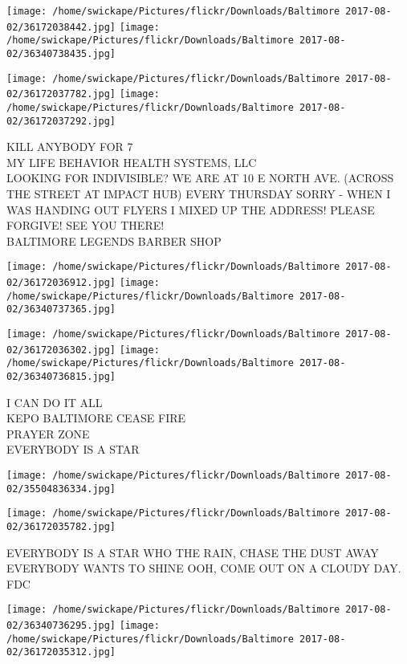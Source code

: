 \documentclass[10pt,letterpaper]{article}
\begin{document}
\texttt{[image: /home/swickape/Pictures/flickr/Downloads/Baltimore 2017-08-02/36172038442.jpg]}
\texttt{[image: /home/swickape/Pictures/flickr/Downloads/Baltimore 2017-08-02/36340738435.jpg]}

\texttt{[image: /home/swickape/Pictures/flickr/Downloads/Baltimore 2017-08-02/36172037782.jpg]}
\texttt{[image: /home/swickape/Pictures/flickr/Downloads/Baltimore 2017-08-02/36172037292.jpg]}

KILL ANYBODY FOR 7\\
MY LIFE BEHAVIOR HEALTH SYSTEMS, LLC\\
LOOKING FOR INDIVISIBLE?  WE ARE AT 10 E NORTH AVE. (ACROSS THE STREET AT IMPACT HUB) EVERY THURSDAY SORRY  {-} WHEN I WAS HANDING OUT FLYERS I MIXED UP THE ADDRESS!  PLEASE FORGIVE!  SEE YOU THERE!\\
BALTIMORE LEGENDS BARBER SHOP
\pagebreak

\texttt{[image: /home/swickape/Pictures/flickr/Downloads/Baltimore 2017-08-02/36172036912.jpg]}
\texttt{[image: /home/swickape/Pictures/flickr/Downloads/Baltimore 2017-08-02/36340737365.jpg]}

\texttt{[image: /home/swickape/Pictures/flickr/Downloads/Baltimore 2017-08-02/36172036302.jpg]}
\texttt{[image: /home/swickape/Pictures/flickr/Downloads/Baltimore 2017-08-02/36340736815.jpg]}

I CAN DO IT ALL\\
KEPO BALTIMORE CEASE FIRE\\
PRAYER ZONE\\
EVERYBODY IS A STAR
\pagebreak

\texttt{[image: /home/swickape/Pictures/flickr/Downloads/Baltimore 2017-08-02/35504836334.jpg]}

\vspace{0.25in}
\texttt{[image: /home/swickape/Pictures/flickr/Downloads/Baltimore 2017-08-02/36172035782.jpg]}

EVERYBODY IS A STAR WHO THE RAIN, CHASE THE DUST AWAY EVERYBODY WANTS TO SHINE OOH, COME OUT ON A CLOUDY DAY.\\
FDC
\pagebreak

\texttt{[image: /home/swickape/Pictures/flickr/Downloads/Baltimore 2017-08-02/36340736295.jpg]}
\texttt{[image: /home/swickape/Pictures/flickr/Downloads/Baltimore 2017-08-02/36172035312.jpg]}
\end{document}

